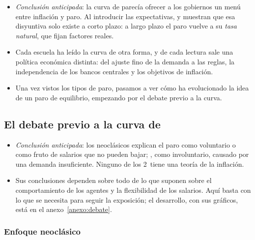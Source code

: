\documentclass[11pt]{article}
\begin{document}
\begin{itemize}
\item \emph{Conclusión anticipada}: la curva de  parecía ofrecer a los gobiernos un menú entre inflación y paro. Al introducir las expectativas,  y  muestran que esa disyuntiva solo existe a corto plazo: a largo plazo el paro vuelve a su \emph{tasa natural}, que fijan factores reales.
\item Cada escuela ha leído la curva de otra forma, y de cada lectura sale una política económica distinta: del ajuste fino de la demanda a las reglas, la independencia de los bancos centrales y los objetivos de inflación.
\item Una vez vistos los tipos de paro, pasamos a ver cómo ha evolucionado la idea de un paro de equilibrio, empezando por el debate previo a la curva.
\end{itemize}

\subsection{El debate previo a la curva de }\label{sec:debate}

\begin{itemize}
\item \emph{Conclusión anticipada}: los neoclásicos explican el paro como voluntario o como fruto de salarios que no pueden bajar; , como involuntario, causado por una demanda insuficiente. Ninguno de los 2~tiene una teoría de la inflación.
\item Sus conclusiones dependen sobre todo de lo que suponen sobre el comportamiento de los agentes y la flexibilidad de los salarios. Aquí basta con lo que se necesita para seguir la exposición; el desarrollo, con sus gráficos, está en el anexo~\ref{anexo:debate}.
\end{itemize}

\subsubsection{Enfoque neoclásico}\label{sec:neoclasico}
\end{document}
